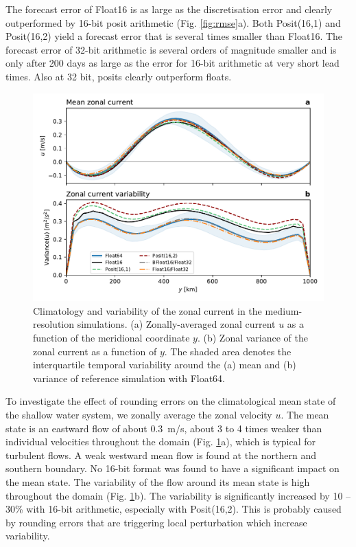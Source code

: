 \documentclass[draft]{agujournal2019}
\begin{document}
The forecast error of Float16 is as large as the discretisation error and clearly outperformed by 16-bit posit arithmetic (Fig. \ref{fig:rmse}a). Both Posit(16,1) and Posit(16,2) yield a forecast error that is several times smaller than Float16. The forecast error of 32-bit arithmetic is several orders of magnitude smaller and is only after 200 days as large as the error for 16-bit arithmetic at very short lead times. Also at 32 bit, posits clearly outperform floats.

\begin{figure}
\includegraphics[width=1\textwidth]{meanvar_u.pdf}
\caption{Climatology and variability of the zonal current in the medium-resolution simulations. (a) Zonally-averaged zonal current $u$ as a function of the meridional coordinate $y$. (b) Zonal variance of the zonal current as a function of $y$. The shaded area denotes the interquartile temporal variability around the (a) mean and (b) variance of reference simulation with Float64.}
\label{fig:mean}
\end{figure}

To investigate the effect of rounding errors on the climatological mean state of the shallow water system, we zonally average the zonal velocity $u$. The mean state is an eastward flow of about 0.3~m/s, about 3 to 4 times weaker than individual velocities throughout the domain (Fig. \ref{fig:mean}a), which is typical for turbulent flows. A weak westward mean flow is found at the northern and southern boundary. No 16-bit format was found to have a significant impact on the mean state. The variability of the flow around its mean state is high throughout the domain (Fig. \ref{fig:mean}b). The variability is significantly increased by 10 -- 30\% with 16-bit arithmetic, especially with Posit(16,2). This is probably caused by rounding errors that are triggering local perturbation which increase variability.
\end{document}
